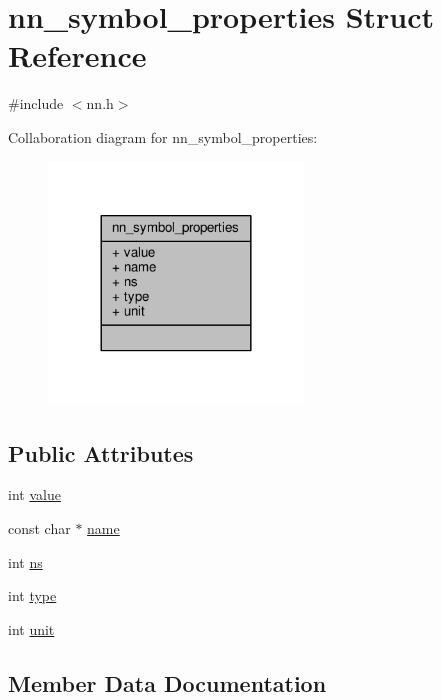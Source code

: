\hypertarget{structnn__symbol__properties}{}\section{nn\+\_\+symbol\+\_\+properties Struct Reference}
\label{structnn__symbol__properties}


{\ttfamily \#include $<$nn.\+h$>$}



Collaboration diagram for nn\+\_\+symbol\+\_\+properties\+:\nopagebreak
\begin{figure}[H]
\begin{center}
\leavevmode
\includegraphics[width=192pt]{structnn__symbol__properties__coll__graph}
\end{center}
\end{figure}
\subsection*{Public Attributes}
\begin{DoxyCompactItemize}
\item 
int \hyperlink{structnn__symbol__properties_a11108a0bae890c4afeeb15eca62fd75d}{value}
\item 
const char $\ast$ \hyperlink{structnn__symbol__properties_af0f2469ed20f491bd25e04b3888578a7}{name}
\item 
int \hyperlink{structnn__symbol__properties_afae5ea3060f71f895430d70cfbed440d}{ns}
\item 
int \hyperlink{structnn__symbol__properties_a79c44b59a88abfb128bb7d8d492d220e}{type}
\item 
int \hyperlink{structnn__symbol__properties_a1fcac8f99a526f5be82bc36e848ce3ec}{unit}
\end{DoxyCompactItemize}


\subsection{Member Data Documentation}
